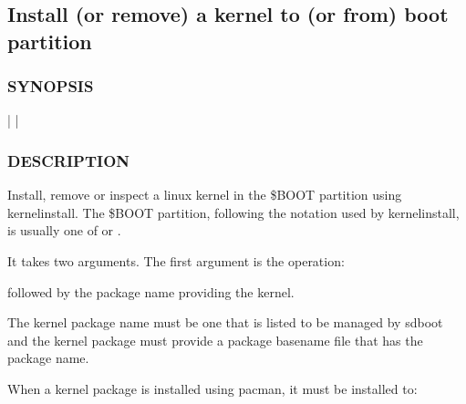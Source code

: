 \documentclass[letterpaper,11pt,english]{sphinxmanual}
\begin{document}
\subsection{Install (or remove) a kernel to (or from) boot partition}
\label{\detokenize{_build/man-ready/sd-boot-kernel-update.8:install-or-remove-a-kernel-to-or-from-boot-partition}}

\subsubsection{SYNOPSIS}
\label{\detokenize{_build/man-ready/sd-boot-kernel-update.8:synopsis}}
\sphinxAtStartPar
{}   |  |  


\subsubsection{DESCRIPTION}
\label{\detokenize{_build/man-ready/sd-boot-kernel-update.8:description}}
\sphinxAtStartPar
Install, remove or inspect a linux kernel in the \$BOOT partition using kernel\sphinxhyphen{}install.
The \$BOOT partition, following the notation used by kernel\sphinxhyphen{}install, is usually one of  or .

\sphinxAtStartPar
It takes two arguments. The first argument is the operation:

\begin{sphinxVerbatim}[commandchars=\\\{\}]
    
\end{sphinxVerbatim}

\sphinxAtStartPar
followed by the package name providing the kernel.

\sphinxAtStartPar
The kernel package name must be one that is listed to be managed by sd\sphinxhyphen{}boot and
the kernel package must provide a package basename file that has the package name.

\sphinxAtStartPar
When a kernel package is installed using pacman, it  must be installed to:

\begin{sphinxVerbatim}[commandchars=\\\{\}]
\end{sphinxVerbatim}
\end{document}
